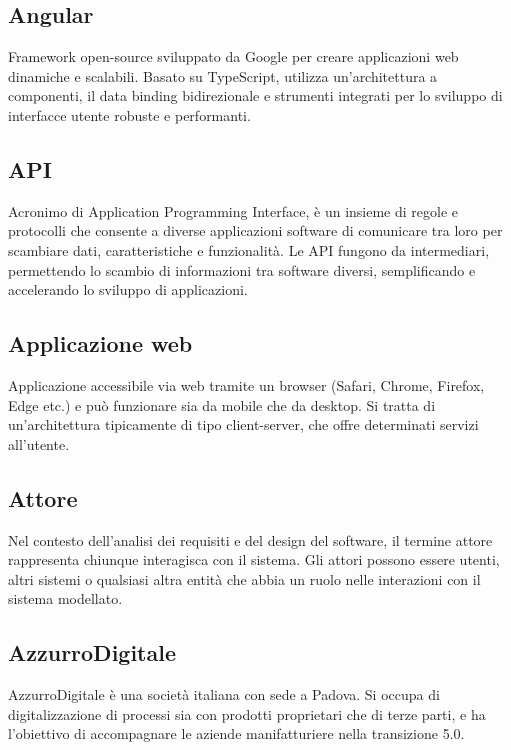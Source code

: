 \hypertarget{sec:angular}{}
\subsection*{Angular}
Framework open-source sviluppato da Google per creare applicazioni web dinamiche e scalabili. Basato su TypeScript, utilizza un'architettura a componenti, 
il data binding bidirezionale e strumenti integrati per lo sviluppo di interfacce utente robuste e performanti.

\hypertarget{sec:api}{}
\subsection*{API}
Acronimo di Application Programming Interface, è un insieme di regole e protocolli che consente a diverse applicazioni software di comunicare tra loro 
per scambiare dati, caratteristiche e funzionalità. Le API fungono da intermediari, permettendo lo scambio di informazioni tra software diversi, semplificando 
e accelerando lo sviluppo di applicazioni.

\hypertarget{sec:applicazione_web}{}
\subsection*{Applicazione web}
Applicazione accessibile via web tramite un browser (Safari, Chrome, Firefox, Edge etc.) e può funzionare sia da mobile che da desktop. Si tratta di un'architettura 
tipicamente di tipo client-server, che offre determinati servizi all'utente.

\hypertarget{sec:attore}{}
\subsection*{Attore}
Nel contesto dell'analisi dei requisiti e del design del software, il termine attore rappresenta chiunque interagisca con il sistema. Gli attori possono 
essere utenti, altri sistemi o qualsiasi altra entità che abbia un ruolo nelle interazioni con il sistema modellato.

\subsection*{AzzurroDigitale}
AzzurroDigitale è una società italiana con sede a Padova. Si occupa di digitalizzazione di processi sia con prodotti proprietari che di terze parti, e 
ha l’obiettivo di accompagnare le aziende manifatturiere nella transizione 5.0.

